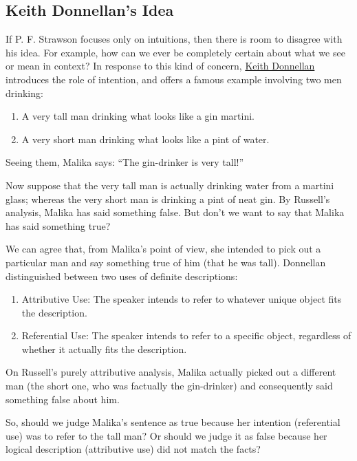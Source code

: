 \documentclass[12pt,a4paper,openany]{article}
\begin{document}
\subsection{Keith Donnellan's Idea}
\label{donnellans-idea}

If P. F. Strawson focuses only on intuitions, then there is room to disagree with his idea. For example, how can we ever be completely certain about what we see or mean in context? In response to this kind of concern, \href{https://en.wikipedia.org/wiki/Keith_Donnellan}{Keith
Donnellan} introduces the role of intention, and offers a famous example involving two men drinking:

\begin{enumerate}
    \item A very tall man drinking what looks like a gin martini.
    \item A very short man drinking what looks like a pint of water.
\end{enumerate}

Seeing them, Malika says: “The gin-drinker is very tall!”

Now suppose that the very tall man is actually drinking water from a martini glass; whereas the very short man is drinking a pint of neat gin. By Russell’s analysis, Malika has said something false. But don't we want to say that Malika has said something true?

We can agree that, from Malika’s point of view, she intended to pick out a particular man and say something true of him (that he was tall). Donnellan distinguished between two uses of definite descriptions:

\begin{enumerate}
    \item Attributive Use: The speaker intends to refer to whatever unique object fits the description.
    \item Referential Use: The speaker intends to refer to a specific object, regardless of whether it actually fits the description. 
\end{enumerate}

On Russell’s purely attributive analysis, Malika actually picked out a different man (the short one, who was factually the gin-drinker) and consequently said something false about him.

So, should we judge Malika’s sentence as true because her intention (referential use) was to refer to the tall man? Or should we judge it as false because her logical description (attributive use) did not match the facts?
\end{document}
